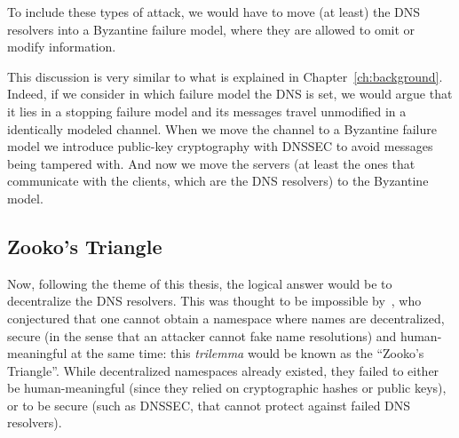 \documentclass[mscthesis]{usiinfthesis}
\begin{document}
To include these types of attack, we would have to move (at least) the DNS resolvers into a Byzantine failure model, where they are allowed to omit or modify information.

This discussion is very similar to what is explained in Chapter~\ref{ch:background}.
Indeed, if we consider in which failure model the DNS is set, we would argue that it lies in a stopping failure model and its messages travel unmodified in a identically modeled channel.
When we move the channel to a Byzantine failure model we introduce public-key cryptography with DNSSEC to avoid messages being tampered with.
And now we move the servers (at least the ones that communicate with the clients, which are the DNS resolvers) to the Byzantine model.

\subsection{Zooko's Triangle}

Now, following the theme of this thesis, the logical answer would be to decentralize the DNS resolvers.
This was thought to be impossible by~\cite{wilcox2003names}, who conjectured that one cannot obtain a namespace where names are decentralized, secure (in the sense that an attacker cannot fake name resolutions) and human-meaningful at the same time: %
this \textit{trilemma} would be known as the ``Zooko's Triangle''. While decentralized namespaces already existed, they failed to either be human-meaningful (since they relied on cryptographic hashes or public keys), or to be secure (such as DNSSEC, that cannot protect against failed DNS resolvers).
\end{document}
